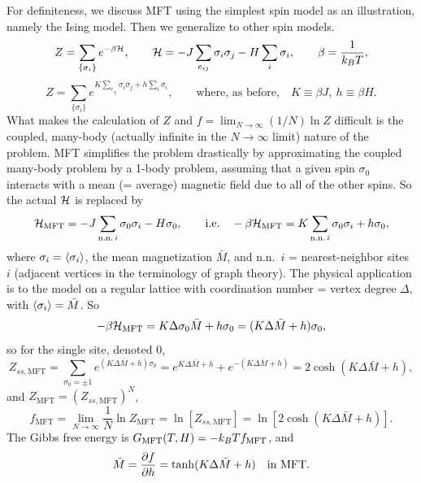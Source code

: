 For definiteness, we discuss MFT using the simplest spin model as an illustration, namely the Ising
model. Then we generalize to other spin models.
\begin{equation}
  Z = \sum_{\{\sigma_i\}}e^{-\beta\mathcal{H}},\qquad
  \mathcal{H} = -J\sum_{e_{ij}}\sigma_i\sigma_j - H\sum_i\sigma_i,\qquad\beta = \frac{1}{k_{B} T},
\end{equation}
\begin{equation}
  Z = \sum_{\{\sigma_i\}}e^{K\sum_{e_{ij}}\sigma_i\sigma_j + h\sum_i\sigma_i},
  \qquad\text{where, as before,}\quad K\equiv\beta J,\ h\equiv\beta H .
\end{equation}
What makes the calculation of $Z$ and $f = \lim_{N\to\infty}(1/N)\ln Z$ difficult is the coupled,
many-body (actually infinite in the $N\to\infty$ limit) nature of the problem. MFT simplifies the
problem drastically by approximating the coupled many-body problem by a 1-body problem, assuming
that a given spin $\sigma_0$ interacts with a mean (= average) magnetic field due to all of the other
spins. So the actual $\mathcal{H}$ is replaced by
\begin{equation}
  \mathcal{H}_{\text{MFT}} = -J\sum_{\text{n.n.}\,i}\sigma_0\sigma_i - H\sigma_0,\qquad\text{i.e.}\quad
  -\beta\mathcal{H}_{\text{MFT}} = K\sum_{\text{n.n.}\,i}\sigma_0\sigma_i + h\sigma_0,
\end{equation}
where $\sigma_i = \langle \sigma_i\rangle$, the mean magnetization $\bar M$, and n.n.\ $i$ = nearest-neighbor
sites $i$ (adjacent vertices in the terminology of graph theory). The physical application is to the
model on a regular lattice with coordination number = vertex degree $\Delta$, with
$\langle \sigma_i\rangle = \bar M$. So
\begin{equation}
  -\beta\mathcal{H}_{\text{MFT}} = K\Delta\sigma_0\bar M + h\sigma_0 = (K\Delta\bar M + h)\sigma_0,
\end{equation}
so for the single site, denoted 0,
\begin{equation}
  Z_{ss,\text{MFT}} = \sum_{\sigma_0=\pm1}e^{(K\Delta\bar M+h)\sigma_0}
  = e^{K\Delta\bar M+h} + e^{-(K\Delta\bar M+h)} = 2\cosh(K\Delta\bar M+h),
\end{equation}
and $Z_{\text{MFT}} = (Z_{ss,\text{MFT}})^N$,
\begin{equation}
  f_{\text{MFT}} = \lim_{N\to\infty}\frac{1}{N}\ln Z_{\text{MFT}} = \ln[Z_{ss,\text{MFT}}]
  = \ln[2\cosh(K\Delta\bar M+h)].
\end{equation}
The Gibbs free energy is $G_{\text{MFT}}(T,H) = -k_{B} Tf_{\text{MFT}}$, and
\begin{equation}
  \bar M = \frac{\partial f}{\partial h} = \tanh(K\Delta\bar M + h)\quad\text{in MFT}.
\end{equation}
